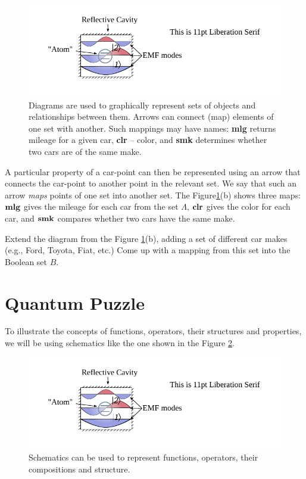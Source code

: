 \begin{figure}[htbp]
  \centering
  \includegraphics[scale=1.0]{defaultFigureTemplate}
  \caption{Diagrams are used to graphically represent sets of objects
    and relationships between them. Arrows can connect (map) elements
    of one set with another. Such mappings may have names: {\bf mlg}
    returns mileage for a given car, {\bf clr} -- color, and {\bf smk}
  determines whether two cars are of the same make.}
  \label{fig:diagrams}
\end{figure}

A particular property of a car-point
can then be represented using an arrow that connects the car-point to
another point in the relevant set. We say that such an arrow \emph{maps}
points of one set into another set. The Figure\ref{fig:diagrams}(b)
shows three maps: $\textrm{\bf mlg}$ gives the mileage for each car from the
set $\Lambda$, $\textrm{\bf clr}$ gives the color for each car, and
$\textrm{\bf smk}$ compares whether two cars have the same make.

\begin{exercise}
Extend the diagram from the Figure \ref{fig:diagrams}(b), adding a set
of different car makes (e.g., Ford, Toyota, Fiat, etc.) Come up with a
mapping from this set into the Boolean set $B$.
\label{exe:carMakesSet}
\end{exercise}

\section{Quantum Puzzle}
To illustrate the concepts of functions, operators, their structures and
properties, we will be using schematics like the one
shown in the Figure \ref{fig:schematicExample}.
\begin{figure}%
  \includegraphics[scale=1.0]{defaultFigureTemplate}
  \caption{Schematics can be used to represent functions, operators,
    their compositions and structure.}
  \label{fig:schematicExample}
\end{figure}

